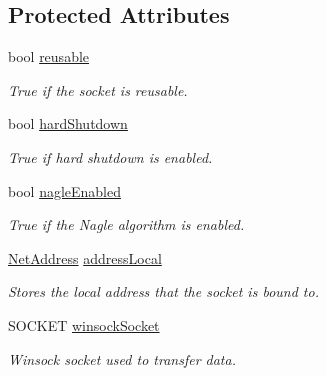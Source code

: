 \subsection*{Protected Attributes}
\begin{DoxyCompactItemize}
\item 
bool \hyperlink{class_net_socket_simple_a0921fd02f526c403ce5143d8fdec77fa}{reusable}
\begin{DoxyCompactList}\small\item\em True if the socket is reusable. \item\end{DoxyCompactList}\item 
bool \hyperlink{class_net_socket_simple_a713a67b50645a31ace94f50aa1bbc289}{hardShutdown}
\begin{DoxyCompactList}\small\item\em True if hard shutdown is enabled. \item\end{DoxyCompactList}\item 
bool \hyperlink{class_net_socket_simple_a7edf43d1de9a08cd1919ba386955951a}{nagleEnabled}
\begin{DoxyCompactList}\small\item\em True if the Nagle algorithm is enabled. \item\end{DoxyCompactList}\item 
\hypertarget{class_net_socket_simple_a3a39c86e3aa202ccb7df330a44c5b574}{
\hyperlink{class_net_address}{NetAddress} \hyperlink{class_net_socket_simple_a3a39c86e3aa202ccb7df330a44c5b574}{addressLocal}}
\label{class_net_socket_simple_a3a39c86e3aa202ccb7df330a44c5b574}

\begin{DoxyCompactList}\small\item\em Stores the local address that the socket is bound to. \item\end{DoxyCompactList}\item 
SOCKET \hyperlink{class_net_socket_simple_ace6b7feadf536e09181b23d45c92cc5f}{winsockSocket}
\begin{DoxyCompactList}\small\item\em Winsock socket used to transfer data. \item\end{DoxyCompactList}\end{DoxyCompactItemize}
